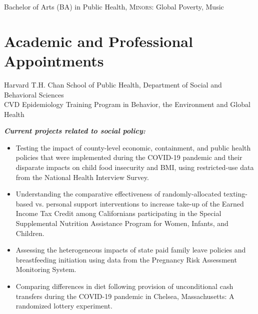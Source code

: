 \documentclass{cv_style}
\begin{document}
\parskip -4pt \noindent  Bachelor of Arts (BA) in Public Health, \textsc{Minors:} Global Poverty, Music


\parskip -5pt 
\section{Academic and Professional Appointments}
\parskip -5pt
\parskip -4pt \noindent Harvard T.H. Chan School of Public Health, Department of Social and Behavioral Sciences \\
CVD Epidemiology Training Program in Behavior, the Environment and Global Health 

\vspace{1em}

\textit{\textbf{Current projects related to social policy:}}
\begin{itemize}
    \item Testing the impact of county-level economic, containment, and public health policies that were implemented during the COVID-19 pandemic and their disparate impacts on child food insecurity and BMI, using restricted-use data from the National Health Interview Survey. \parskip 1pt
    \item Understanding the comparative effectiveness of randomly-allocated texting-based vs. personal support interventions to increase take-up of the Earned Income Tax Credit among Californians participating in the Special Supplemental Nutrition Assistance Program for Women, Infants, and Children. \parskip 1pt
    \item Assessing the heterogeneous impacts of state paid family leave policies and breastfeeding initiation using data from the Pregnancy Risk Assessment Monitoring System. \parskip 1pt
    \item Comparing differences in diet following provision of unconditional cash transfers during the COVID-19 pandemic in Chelsea, Massachusetts: A randomized lottery experiment.
\end{itemize}
\end{document}
